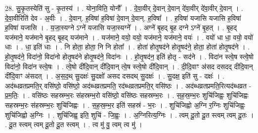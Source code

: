 \documentclass[17pt]{extarticle}
\begin{document}
28. सु॒कृ॒तस्येति॑ सु - कृ॒तस्य॑ । . योना॒विति॒ योनौ᳚ । . दे॒वा॒वीर् दे॒वान् दे॒वान् दे॑वा॒वीर् दे॑वा॒वीर् दे॒वान् । . दे॒वा॒वीरिति॑ देव - अ॒वीः । . दे॒वान्. ह॒विषा॑ ह॒विषा॑ दे॒वान् दे॒वान्. ह॒विषा᳚ । . ह॒विषा॑ यजासि यजासि ह॒विषा॑ ह॒विषा॑ यजासि । . य॒जा॒स्यग्ने ऽग्ने॑ यजासि यजा॒स्यग्ने᳚ । . अग्ने॑ बृ॒हद् बृ॒ह दग्ने ऽग्ने॑ बृ॒हत् । . बृ॒हद् यज॑माने॒ यज॑माने बृ॒हद् बृ॒हद् यज॑माने । . यज॑माने॒ वयो॒ वयो॒ यज॑माने॒ यज॑माने॒ वयः॑ । . वयो॑ धा धा॒ वयो॒ वयो॑ धाः । . धा॒ इति॑ धाः । . नि होता॒ होता॒ नि नि होता᳚ । . होता॑ होतृ॒षद॑ने होतृ॒षद॑ने॒ होता॒ होता॑ होतृ॒षद॑ने । . हो॒तृ॒षद॑ने॒ विदा॑नो॒ विदा॑नो होतृ॒षद॑ने होतृ॒षद॑ने॒ विदा॑नः । . हो॒तृ॒षद॑न॒ इति॑ होतृ - सद॑ने । . विदा॑न स्त्वे॒ष स्त्वे॒षो विदा॑नो॒ विदा॑न स्त्वे॒षः । . त्वे॒षो दी॑दि॒वान् दी॑दि॒वान् त्वे॒ष स्त्वे॒षो दी॑दि॒वान् । . दी॒दि॒वाꣳ अ॑सद दसदद् दीदि॒वान् दी॑दि॒वाꣳ अ॑सदत् । . अ॒स॒द॒थ् सु॒दक्षः॑ सु॒दक्षो॑ असद दसदथ् सु॒दक्षः॑ । . सु॒दक्ष॒ इति॑ सु - दक्षः॑ । . अद॑ब्धव्रतप्रमति॒र् वसि॑ष्ठो॒ वसि॑ष्ठो॒ अद॑ब्धव्रतप्रमति॒ रद॑ब्धव्रतप्रमति॒र् वसि॑ष्ठः । . अद॑ब्धव्रतप्रमति॒रित्यद॑ब्धव्रत - प्र॒म॒तिः॒ । . वसि॑ष्ठः सहस्रम्भ॒रः स॑हस्रम्भ॒रो वसि॑ष्ठो॒ वसि॑ष्ठः सहस्रम्भ॒रः । . स॒ह॒स्र॒म्भ॒रः शुचि॑जिह्वः॒ शुचि॑जिह्वः सहस्रम्भ॒रः स॑हस्रम्भ॒रः शुचि॑जिह्वः । . स॒ह॒स्र॒म्भ॒र इति॑ सहस्रं - भ॒रः । . शुचि॑जिह्वो अ॒ग्नि र॒ग्निः शुचि॑जिह्वः॒ शुचि॑जिह्वो अ॒ग्निः । . शुचि॑जिह्व॒ इति॒ शुचि॑ - जि॒ह्वः॒ । . अ॒ग्निरित्य॒ग्निः । . त्वम् दू॒तो दू॒त स्त्वम् त्वम् दू॒तः । . दू॒त स्त्वम् त्वम् दू॒तो दू॒त स्त्वम् । . त्व मु॑ वु॒ त्वम् त्व मु॑ । \newline
\end{document}
